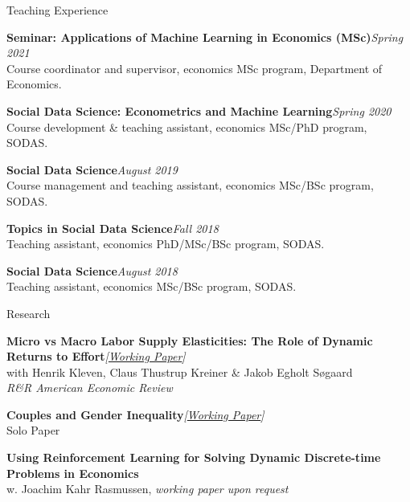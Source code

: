 \documentclass[
	10pt, %
]{resume} %
\begin{document}
\begin{rSection}{Teaching Experience}

    \textbf{Seminar: Applications of Machine Learning in Economics (MSc)}\hfill \textit{Spring 2021} \\
    Course coordinator and supervisor, economics MSc program, Department of Economics.

    \textbf{Social Data Science: Econometrics and Machine Learning}\hfill \textit{Spring 2020} \\
    Course development \& teaching assistant, economics MSc/PhD program, SODAS.

    \textbf{Social Data Science}\hfill \textit{August 2019} \\
    Course management and teaching assistant, economics MSc/BSc program, SODAS.

    \textbf{Topics in Social Data Science}\hfill \textit{Fall 2018} \\
    Teaching assistant, economics PhD/MSc/BSc program, SODAS.

    \textbf{Social Data Science}\hfill \textit{August 2018} \\
    Teaching assistant, economics MSc/BSc program, SODAS.

\end{rSection}

\newpage

\begin{rSection}{Research}

    \textbf{Micro vs Macro Labor Supply Elasticities: The Role of Dynamic Returns to Effort}\hfill \textit{[\href{https://www.nber.org/papers/w31549}{Working Paper}]} \\
    with Henrik Kleven, Claus Thustrup Kreiner \& Jakob Egholt Søgaard \\
    \textit{R\&R American Economic Review}

    \textbf{Couples and Gender Inequality}\hfill \textit{[\href{https://ssrn.com/abstract=4697847}{Working Paper}]} \\
    Solo Paper

    \textbf{Using Reinforcement Learning for Solving Dynamic Discrete-time Problems in Economics} \\
    w. Joachim Kahr Rasmussen, \textit{working paper upon request}
\end{rSection}
\end{document}
